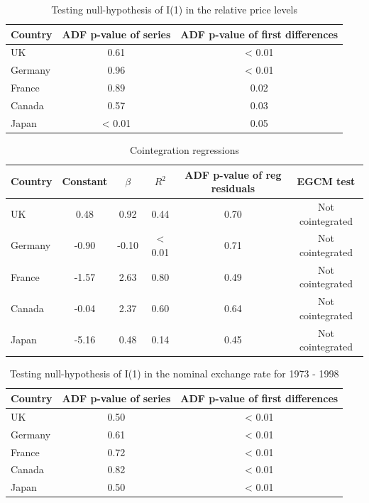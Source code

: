 \documentclass[]{article}
\begin{document}
\begin{table}

\caption{\label{tab:pl}Testing null-hypothesis of I(1) in the relative price levels}
\centering
\begin{tabular}[t]{lcc}
\toprule
Country & ADF p-value of series & ADF p-value of first differences\\
\midrule
UK & 0.61 & < 0.01\\
Germany & 0.96 & < 0.01\\
France & 0.89 & 0.02\\
Canada & 0.57 & 0.03\\
Japan & < 0.01 & 0.05\\
\bottomrule
\end{tabular}
\end{table}

\begin{table}

\caption{\label{tab:coin}Cointegration regressions}
\centering
\begin{tabular}[t]{lccccc}
\toprule
Country & Constant & $\beta$ & $R^2$ & ADF p-value of reg residuals & EGCM test\\
\midrule
UK & 0.48 & 0.92 & 0.44 & 0.70 & Not cointegrated\\
Germany & -0.90 & -0.10 & < 0.01 & 0.71 & Not cointegrated\\
France & -1.57 & 2.63 & 0.80 & 0.49 & Not cointegrated\\
Canada & -0.04 & 2.37 & 0.60 & 0.64 & Not cointegrated\\
Japan & -5.16 & 0.48 & 0.14 & 0.45 & Not cointegrated\\
\bottomrule
\end{tabular}
\end{table}

\begin{table}

\caption{\label{tab:ner2}Testing null-hypothesis of I(1) in the nominal exchange rate for 1973 - 1998}
\centering
\begin{tabular}[t]{lcc}
\toprule
Country & ADF p-value of series & ADF p-value of first differences\\
\midrule
UK & 0.50 & < 0.01\\
Germany & 0.61 & < 0.01\\
France & 0.72 & < 0.01\\
Canada & 0.82 & < 0.01\\
Japan & 0.50 & < 0.01\\
\bottomrule
\end{tabular}
\end{table}
\end{document}
